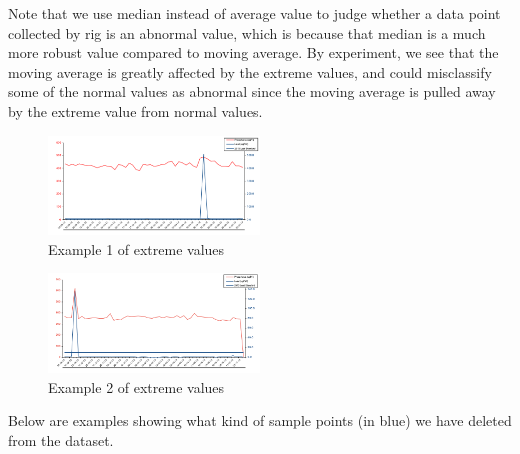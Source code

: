 \documentclass[11pt,twoside]{article}
\numberwithin{Theorem}{section}
\numberwithin{Definition}{section}
\numberwithin{Lemma}{section}
\numberwithin{Algorithm}{section}
\numberwithin{equation}{section}
\begin{document}
Note that we use median instead of average value to judge whether a data point collected by rig is an abnormal value, which is because that median is a much more robust value compared to moving average. By experiment, we see that the moving average is greatly affected by the extreme values, and could misclassify some of the normal values as abnormal since the moving average is pulled away by the extreme value from normal values.

\begin{figure}[!ht]
    \centering
    \includegraphics[width=0.5\textwidth]{p1.png}
    \caption{Example 1 of extreme values}
    \end{figure}

\begin{figure}[!ht]
    \centering
    \includegraphics[width=0.5\textwidth]{p2.png}
    \caption{Example 2 of extreme values}
    \end{figure}

Below are examples showing what kind of sample points (in blue) we have deleted from the dataset.
\end{document}
